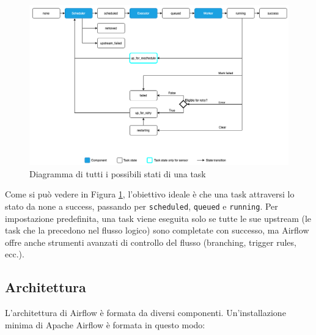 \begin{figure}[h]
    \centering
    \includegraphics[width=\textwidth]{img/task_lifecycle_diagram.png}
    \caption{Diagramma di tutti i possibili stati di una task}
    \label{fig:task_lifecycle}
\end{figure}



Come si può vedere in Figura \ref{fig:task_lifecycle}, l'obiettivo ideale è che una task attraversi lo stato da none a success, passando per \texttt{scheduled}, \texttt{queued} e \texttt{running}. Per impostazione predefinita, una task viene eseguita solo se tutte le sue upstream (le task che la precedono nel flusso logico) sono completate con successo, ma Airflow offre anche strumenti avanzati di controllo del flusso (branching, trigger rules, ecc.).

\newpage

\subsection{Architettura}
\label{sec:architettura}
L'architettura di Airflow è formata da diversi componenti. Un'installazione minima di Apache Airflow è formata in questo modo: 

